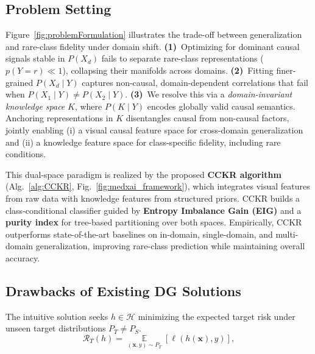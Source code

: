 \documentclass{article}
\begin{document}
\subsection{Problem Setting}
\label{sec:problem}
Figure~\ref{fig:problemFormulation} illustrates the trade-off between
generalization and rare-class fidelity under domain shift.
\textbf{(1)}~Optimizing for dominant causal signals stable in $P(X_d)$
fails to separate rare-class representations ($p(Y=r) \ll 1$), collapsing
their manifolds across domains.
\textbf{(2)}~Fitting finer-grained $P(X_d \mid Y)$ captures non-causal,
domain-dependent correlations that fail when $P(X_1 \mid Y) \neq P(X_2 \mid Y)$.
\textbf{(3)}~We resolve this via a \emph{domain-invariant knowledge space}
$K$, where $P(K \mid Y)$ encodes globally valid causal semantics. Anchoring
representations in $K$ disentangles causal from non-causal factors,
jointly enabling (i) a visual causal feature space for cross-domain
generalization and (ii) a knowledge feature space for class-specific
fidelity, including rare conditions.

This dual-space paradigm is realized by the proposed \textbf{CCKR
algorithm} (Alg.~\ref{alg:CCKR}, Fig.~\ref{fig:medxai_framework}), which
integrates visual features from raw data with knowledge features from
structured priors. CCKR builds a class-conditional classifier guided by
\textbf{Entropy Imbalance Gain (EIG)} and a \textbf{purity index} for
tree-based partitioning over both spaces. Empirically, CCKR outperforms
state-of-the-art baselines on in-domain, single-domain, and multi-domain
generalization, improving rare-class prediction while maintaining overall
accuracy.

\subsection{Drawbacks of Existing DG Solutions}
The intuitive solution seeks $h \in \mathcal{H}$ minimizing the expected
target risk under unseen target distributions $P_T \neq P_S$.
\begin{equation}
\mathcal{R}_T(h) = \mathop{\mathbb{E}}\limits_{(\mathbf{x},y)\sim P_T}[\ell(h(\mathbf{x}),y)],
\end{equation}
\end{document}
